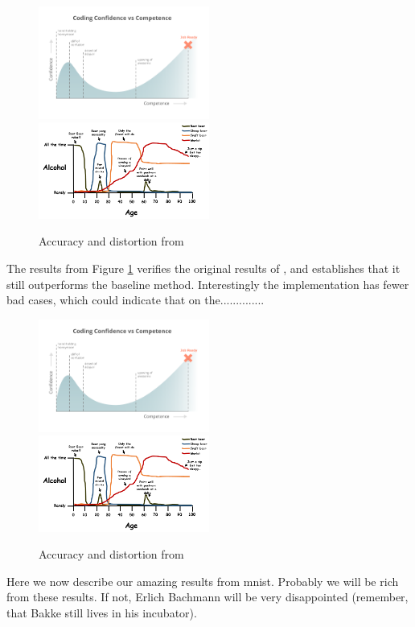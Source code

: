 \begin{figure}[h]
\includegraphics[width=0.5\textwidth]{figures/coding_graph}
\includegraphics[width=0.5\textwidth]{figures/alcohol_graph}
\caption{Accuracy and distortion from \sift{}}
\label{fig:graph sift}
\end{figure}
\clearpage{}
The results from Figure \ref{fig:graph sift} verifies the original results of \qs{}, and establishes that it still outperforms the baseline method. Interestingly the \qsr{} implementation has fewer bad cases, which could indicate that on the..............

\begin{figure}[h]
\includegraphics[width=0.5\textwidth]{figures/coding_graph}
\includegraphics[width=0.5\textwidth]{figures/alcohol_graph}
\caption{Accuracy and distortion from \mnist{}}
\label{fig:graph mnist}
\end{figure}
Here we now describe our amazing results from mnist. Probably we will be rich from these results. If not, Erlich Bachmann will be very disappointed (remember, that Bakke still lives in his incubator). 

